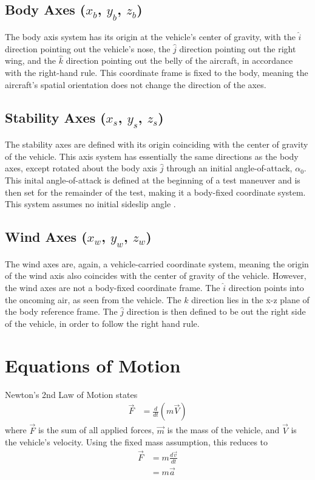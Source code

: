 \documentclass[12pt]{ucthesis}
\begin{document}
\subsection*{Body Axes ($x_b$, $y_b$, $z_b$)}
The body axis system has its origin at the vehicle's center of gravity, with the $\hat{i}$ direction pointing out the vehicle's nose, the $\hat{j}$ direction pointing out the right wing, and the $\hat{k}$ direction pointing out the belly of the aircraft, in accordance with the right-hand rule. This coordinate frame is fixed to the body, meaning the aircraft's spatial orientation does not change the direction of the axes.

\subsection*{Stability Axes ($x_s$, $y_s$, $z_s$)}
The stability axes are defined with its origin coinciding with the center of gravity of the vehicle. This axis system has essentially the same directions as the body axes, except rotated about the body axis $\hat{j}$ through an initial angle-of-attack, $\alpha_{0}$. This inital angle-of-attack is defined at the beginning of a test maneuver and is then set for the remainder of the test, making it a body-fixed coordinate system. This system assumes no initial sideslip angle \cite{roskam2001airplane}.

\subsection*{Wind Axes ($x_w$, $y_w$, $z_w$)}
The wind axes are, again, a vehicle-carried coordinate system, meaning the origin of the wind axis also coincides with the center of gravity of the vehicle. However, the wind axes are not a body-fixed coordinate frame. The $\hat{i}$ direction points into the oncoming air, as seen from the vehicle. The $\hat{k}$ direction lies in the x-z plane of the body reference frame. The $\hat{j}$ direction is then defined to be out the right side of the vehicle, in order to follow the right hand rule. 

\section{Equations of Motion}
\label{sys-desc}
Newton's 2nd Law of Motion states
\begin{align}
\vec{F} &= \frac{d}{dt}(m\vec{V})
\end{align}
where $\vec{F}$ is the sum of all applied forces, $\vec{m}$ is the mass of the vehicle, and $\vec{V}$ is the vehicle's velocity. Using the fixed mass assumption, this reduces to 
\begin{align}
\vec{F} &= m\frac{d\vec{v}}{dt}\\
&= m\vec{a}
\end{align}
\end{document}
